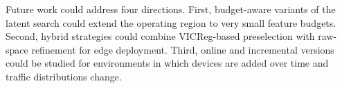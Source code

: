 Future work could address four directions. First, budget-aware variants of the latent search could extend the operating region to very small feature budgets. Second, hybrid strategies could combine VICReg-based preselection with raw-space refinement for edge deployment. Third, online and incremental versions could be studied for environments in which devices are added over time and traffic distributions change. 
